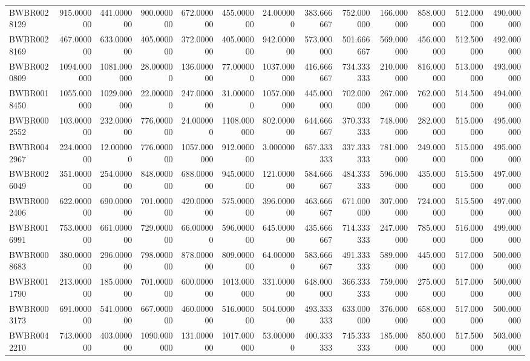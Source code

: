 \begin{longtable}{lrrrrrrrrrrrr}
BWBR0028129 & 915.000000 & 441.000000 & 900.000000 & 672.000000 & 455.000000 & 24.000000 & 383.666667 & 752.000000 & 166.000000 & 858.000000 & 512.000000 & 490.000000 \\
BWBR0028169 & 467.000000 & 633.000000 & 405.000000 & 372.000000 & 405.000000 & 942.000000 & 573.000000 & 501.666667 & 569.000000 & 456.000000 & 512.500000 & 492.000000 \\
BWBR0020809 & 1094.000000 & 1081.000000 & 28.000000 & 136.000000 & 77.000000 & 1037.000000 & 416.666667 & 734.333333 & 210.000000 & 816.000000 & 513.000000 & 493.000000 \\
BWBR0018450 & 1055.000000 & 1029.000000 & 22.000000 & 247.000000 & 31.000000 & 1057.000000 & 445.000000 & 702.000000 & 267.000000 & 762.000000 & 514.500000 & 494.000000 \\
BWBR0002552 & 103.000000 & 232.000000 & 776.000000 & 24.000000 & 1108.000000 & 802.000000 & 644.666667 & 370.333333 & 748.000000 & 282.000000 & 515.000000 & 495.000000 \\
BWBR0042967 & 224.000000 & 12.000000 & 776.000000 & 1057.000000 & 912.000000 & 3.000000 & 657.333333 & 337.333333 & 781.000000 & 249.000000 & 515.000000 & 495.000000 \\
BWBR0026049 & 351.000000 & 254.000000 & 848.000000 & 688.000000 & 945.000000 & 121.000000 & 584.666667 & 484.333333 & 596.000000 & 435.000000 & 515.500000 & 497.000000 \\
BWBR0002406 & 622.000000 & 690.000000 & 701.000000 & 420.000000 & 575.000000 & 396.000000 & 463.666667 & 671.000000 & 307.000000 & 724.000000 & 515.500000 & 497.000000 \\
BWBR0016991 & 753.000000 & 661.000000 & 729.000000 & 66.000000 & 596.000000 & 645.000000 & 435.666667 & 714.333333 & 247.000000 & 785.000000 & 516.000000 & 499.000000 \\
BWBR0008683 & 380.000000 & 296.000000 & 798.000000 & 878.000000 & 809.000000 & 64.000000 & 583.666667 & 491.333333 & 589.000000 & 445.000000 & 517.000000 & 500.000000 \\
BWBR0011790 & 213.000000 & 185.000000 & 701.000000 & 600.000000 & 1013.000000 & 331.000000 & 648.000000 & 366.333333 & 759.000000 & 275.000000 & 517.000000 & 500.000000 \\
BWBR0003173 & 691.000000 & 541.000000 & 667.000000 & 460.000000 & 516.000000 & 504.000000 & 493.333333 & 633.000000 & 376.000000 & 658.000000 & 517.000000 & 500.000000 \\
BWBR0042210 & 743.000000 & 403.000000 & 1090.000000 & 131.000000 & 1017.000000 & 53.000000 & 400.333333 & 745.333333 & 185.000000 & 850.000000 & 517.500000 & 503.000000 \\

\end{longtable}
